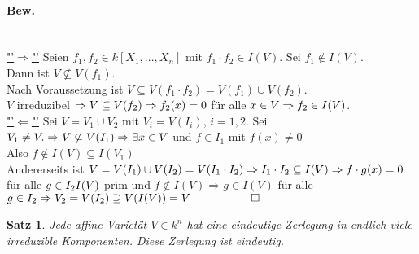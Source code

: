 \documentclass[a4paper,12pt]{report}
\theoremstyle{break}
\newtheorem{Satz}{Satz}
\theoremstyle{nonumberbreak}
\theoremstyle{nonumberplain}
\begin{document}
\paragraph{Bew.}~\\
\underline{"'$\Rightarrow$"'} Seien $f_1, f_2\in k[X_1,...,X_n]$ mit $f_1\cdot f_2\in I(V)$. Sei $f_1\notin I(V)$.\\
Dann ist $V\nsubseteq V(f_1)$. \\
Nach Voraussetzung ist $V\subseteq V(f_1\cdot f_2)= V(f_1)\cup V(f_2)$.\\
$V$ irreduzibel $\Rightarrow V\subseteq V(f_2)\\
\Rightarrow f_2(x)=0$ für alle $x\in V\\
\Rightarrow f_2\in I(V)$.\\
\underline{"'$\Leftarrow$"'} Sei $V=V_1\cup V_2$ mit $V_i=V(I_i)$, $i=1,2$. Sei $V_1 \neq V.\\
\Rightarrow V \nsubseteq V(I_1)\\
\Rightarrow \exists x \in V$ und $f\in I_1$ mit $f(x)\neq 0$\\
Also $f\notin I(V)\subseteq I(V_1)$\\
Andererseits ist $V=V(I_1)\cup V(I_2)= V(I_1\cdot I_2)\Rightarrow I_1\cdot I_2\subseteq I(V)\\
\Rightarrow f\cdot g(x)=0$ für alle $g\in I_2\\
I(V)$ prim und $f\notin I(V)\Rightarrow g\in I(V)$ für alle $g\in I_2\\
\Rightarrow V_2 = V(I_2)\supseteq V(I(V))=V~~~~~~~~~~~~~~~~\Box$
\begin{Satz}
Jede affine Varietät $V\in k^n$ hat eine eindeutige Zerlegung in endlich viele irreduzible Komponenten. Diese Zerlegung ist eindeutig. 
\end{Satz}
\end{document}
